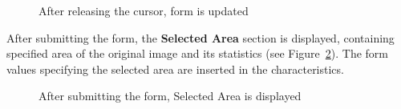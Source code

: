 \begin{figure}[H]
   \begin{center}
		 \hfill
      \caption{After releasing the cursor, form is updated} \label{fig:drag2}
	\end{center}
\end{figure}

After submitting the form, the \textbf{Selected Area} section is
displayed, containing specified area of the original image and its statistics
(see Figure~\ref{fig:drag3}). The form values specifying the selected
area are inserted in the characteristics.

\begin{figure}[H]
   \begin{center}
		 \hfill
      \caption{After submitting the form, Selected Area is displayed} \label{fig:drag3}
	\end{center}
\end{figure}

